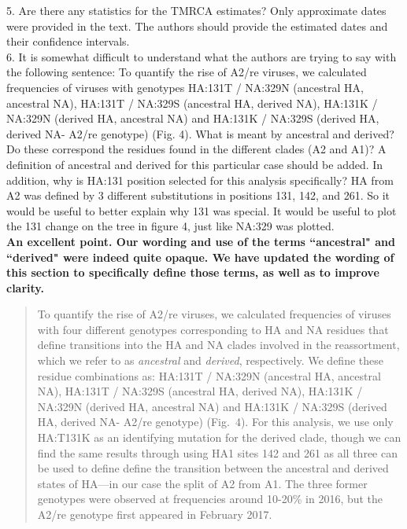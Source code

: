 \documentclass[11pt,oneside,letterpaper]{article}
\begin{document}
5. Are there any statistics for the TMRCA estimates? Only approximate dates were provided in the text. The authors should provide the estimated dates and their confidence intervals.\\

6. It is somewhat difficult to understand what the authors are trying to say with the following sentence: To quantify the rise of A2/re viruses, we calculated frequencies of viruses with genotypes HA:131T / NA:329N (ancestral HA, ancestral NA), HA:131T / NA:329S (ancestral HA, derived NA), HA:131K / NA:329N (derived HA, ancestral NA) and HA:131K / NA:329S (derived HA, derived NA- A2/re genotype) (Fig. 4). What is meant by ancestral and derived? Do these correspond the residues found in the different clades (A2 and A1)? A definition of ancestral and derived for this particular case should be added. In addition, why is HA:131 position selected for this analysis specifically? HA from A2 was defined by 3 different substitutions in positions 131, 142, and 261. So it would be useful to better explain why 131 was special. It would be useful to plot the 131 change on the tree in figure 4, just like NA:329 was plotted.\\

\textbf{An excellent point. Our wording and use of the terms ``ancestral" and ``derived" were indeed quite opaque. We have updated the wording of this section to specifically define those terms, as well as to improve clarity.}

\begin{quotation}
  To quantify the rise of A2/re viruses, we calculated frequencies of viruses with four different genotypes corresponding to HA and NA residues that define transitions into the HA and NA clades involved in the reassortment, which we refer to as \textit{ancestral} and \textit{derived}, respectively.
  We define these residue combinations as: HA:131T / NA:329N (ancestral HA, ancestral NA), HA:131T / NA:329S (ancestral HA, derived NA), HA:131K / NA:329N (derived HA, ancestral NA) and HA:131K / NA:329S (derived HA, derived NA- A2/re genotype) (Fig.~4).
  For this analysis, we use only HA:T131K as an identifying mutation for the derived clade, though we can find the same results through using HA1 sites 142 and 261 as all three can be used to define define the transition between the ancestral and derived states of HA---in our case the split of A2 from A1.
  The three former genotypes were observed at frequencies around 10-20\% in 2016, but the A2/re genotype first appeared in February 2017.
\end{quotation}
\end{document}
